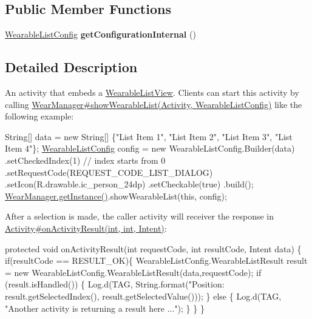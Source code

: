 \subsection*{Public Member Functions}
\begin{DoxyCompactItemize}
\item 
\hyperlink{classcom_1_1google_1_1devrel_1_1wcl_1_1widgets_1_1list_1_1WearableListConfig}{Wearable\+List\+Config} {\bfseries get\+Configuration\+Internal} ()\hypertarget{classcom_1_1google_1_1devrel_1_1wcl_1_1widgets_1_1list_1_1WclWearableListViewActivity_a9f02582f16faf9ca8c25465798f40f63}{}\label{classcom_1_1google_1_1devrel_1_1wcl_1_1widgets_1_1list_1_1WclWearableListViewActivity_a9f02582f16faf9ca8c25465798f40f63}

\end{DoxyCompactItemize}


\subsection{Detailed Description}
An activity that embeds a \hyperlink{}{Wearable\+List\+View}. Clients can start this activity by calling \hyperlink{classcom_1_1google_1_1devrel_1_1wcl_1_1WearManager_a446c9ae3e23609bc16d87e4ece91ed72}{Wear\+Manager\#show\+Wearable\+List(\+Activity, Wearable\+List\+Config)} like the following example\+:


\begin{DoxyPre}
    String[] data = new String[] \{"List Item 1", "List Item 2", "List Item 3", "List Item 4"\};
    \hyperlink{classcom_1_1google_1_1devrel_1_1wcl_1_1widgets_1_1list_1_1WearableListConfig}{WearableListConfig} config = new WearableListConfig.Builder(data)
        .setCheckedIndex(1) // index starts from 0
        .setRequestCode(REQUEST\_CODE\_LIST\_DIALOG)
        .setIcon(R.drawable.ic\_person\_24dp)
        .setCheckable(true)
        .build();
    \hyperlink{classcom_1_1google_1_1devrel_1_1wcl_1_1WearManager_a5e9a61518e44bb2c1a89706d51240661}{WearManager.getInstance()}.showWearableList(this, config);
\end{DoxyPre}


After a selection is made, the caller activity will receiver the response in \hyperlink{}{Activity\#on\+Activity\+Result(int, int, Intent)}\+:


\begin{DoxyPre}
    protected void onActivityResult(int requestCode, int resultCode, Intent data) \{
        if(resultCode == RESULT\_OK)\{
            WearableListConfig.WearableListResult result
                   = new WearableListConfig.WearableListResult(data,requestCode);
            if (result.isHandled()) \{
                Log.d(TAG, String.format("Position: %
                        result.getSelectedIndex(), result.getSelectedValue()));
            \} else \{
                Log.d(TAG, "Another activity is returning a result here ...");
            \}
         \}
     \}
\end{DoxyPre}


